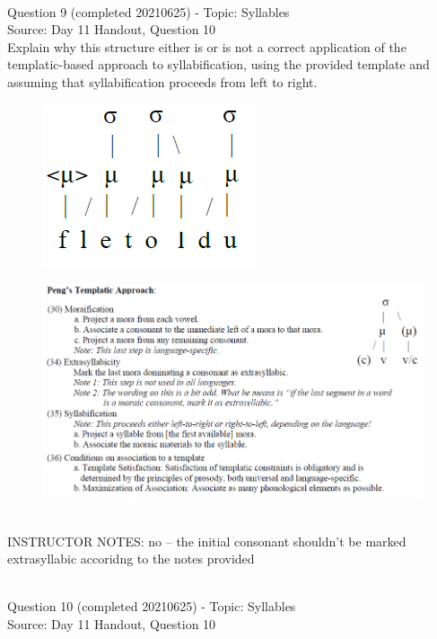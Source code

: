 \documentclass[12pt]{article}
\begin{document}
~\\

{\large Question 9} (completed 20210625) - Topic: Syllables\\
Source: Day 11 Handout, Question 10\\

Explain why this structure either is or is not a correct application of the templatic-based approach to syllabification, using the provided template and assuming that syllabification proceeds from left to right.\\

\begin{figure}[H]
\includegraphics{../images/pengtemplate_fletoldu_no.png}
\end{figure}
\begin{figure}[H]
\includegraphics{../images/peng_template_withdiagram.png}
\end{figure}

~\\
INSTRUCTOR NOTES: no -- the initial consonant shouldn't be marked extrasyllabic accoridng to the notes provided


~\\

{\large Question 10} (completed 20210625) - Topic: Syllables\\
Source: Day 11 Handout, Question 10\\
\end{document}
